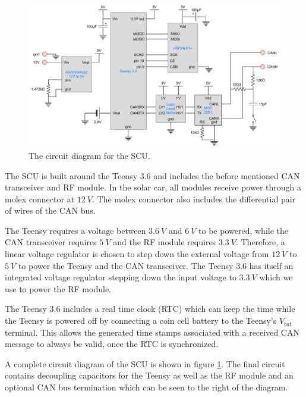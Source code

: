 \documentclass[conference]{IEEEtran}
\begin{document}
\begin{figure}
    \centering
    \includegraphics[width=\linewidth]{documentation/images/SCU_CircuitDiagram.pdf}
    \caption{The circuit diagram for the SCU.}
    \label{fig:SCU_circuit}
\end{figure}

The SCU is built around the Teensy 3.6 and includes the before mentioned CAN transceiver and RF module. In the solar car, all modules receive power through a molex connector at $\SI{12}{V}$. The molex connector also includes the differential pair of wires of the CAN bus. 

The Teensy requires a voltage between $\SI{3.6}{V}$ and $\SI{6}{V}$ to be powered, while the CAN transceiver requires $\SI{5}{V}$ and the RF module requires $\SI{3.3}{V}$. Therefore, a linear voltage regulator is chosen to step down the external voltage from $\SI{12}{V}$ to $\SI{5}{V}$ to power the Teensy and the CAN transceiver. The Teensy 3.6 has itself an integrated voltage regulator stepping down the input voltage to $\SI{3.3}{V}$ which we use to power the RF module.

The Teensy 3.6 includes a real time clock (RTC) which can keep the time while the Teensy is powered off by connecting a coin cell battery to the Teensy's $V_{bat}$ terminal. This allows the generated time stamps associated with a received CAN message to always be valid, once the RTC is synchronized. 

A complete circuit diagram of the SCU is shown in figure \ref{fig:SCU_circuit}. The final circuit contains decoupling capacitors for the Teensy as well as the RF module and an optional CAN bus termination which can be seen to the right of the diagram.
\end{document}
